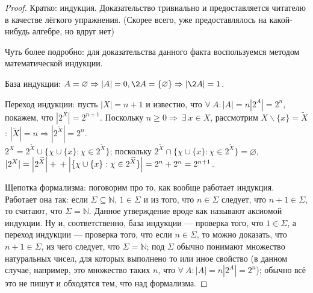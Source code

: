 \begin{proof}
    Кратко: индукция. Доказательство тривиально и предоставляется читателю в качестве лёгкого упражнения. (Скорее всего, уже предоставлялось на какой-нибудь алгебре, но вдруг нет)

    Чуть более подробно: для доказательства данного факта воспользуемся методом математической индукции.

    База индукции: $A=\varnothing \Rightarrow |A|=0, \2{A}=\{\varnothing\} \Rightarrow \left|\2{A}\right|=1$.

    Переход индукции: пусть $|X|=n+1$ и известно, что $\forall ~A: |A|=n \left|2^A\right|=2^n$, покажем, что $\left|2^X\right|=2^{n+1}$.
    Поскольку $n \geq 0 \Rightarrow ~\exists ~x \in X$, рассмотрим $X\backslash\{x\}=\widetilde{X}$: $|\widetilde{X}|=n \Rightarrow \left|2^{\widetilde{X}}\right|=2^n$.\\$2^X=2^{\widetilde{X}}\cup \{\chi\cup\{x\}:\chi \in 2^{\widetilde{X}}\}$; поскольку $2^{\widetilde{X}}\cap \{\chi\cup\{x\}:\chi \in 2^{\widetilde{X}}\}=\varnothing$, $|2^X|=\left|2^{\widetilde{X}}\right|+\\+ \left|\{\chi\cup\{x\}:\chi \in 2^{\widetilde{X}}\}\right|=2^n+2^n=2^{n+1}$.

    Щепотка формализма: поговорим про то, как вообще работает индукция. Работает она так: если $\Sigma \subseteq \mathbb{N}$, $1 \in \Sigma$ и из того, что $n \in \Sigma$ следует, что $n+1 \in \Sigma$, то считают, что $\Sigma=\mathbb{N}$. Данное утверждение вроде как называют аксиомой индукции. Ну и, соответственно, база индукции — проверка того, что $1 \in \Sigma$, а переход индукции — проверка того, что если $n \in \Sigma$, то можно доказать, что $n + 1 \in \Sigma$, из чего следует, что $\Sigma=\mathbb{N}$; под $\Sigma$ обычно понимают множество натуральных чисел, для которых выполнено то или иное свойство (в данном случае, например, это множество таких $n$, что $\forall ~A: |A|=n \left|2^A\right|=2^n$); обычно всё это не пишут и обходятся тем, что над  формализма\guillemotright.
\end{proof}